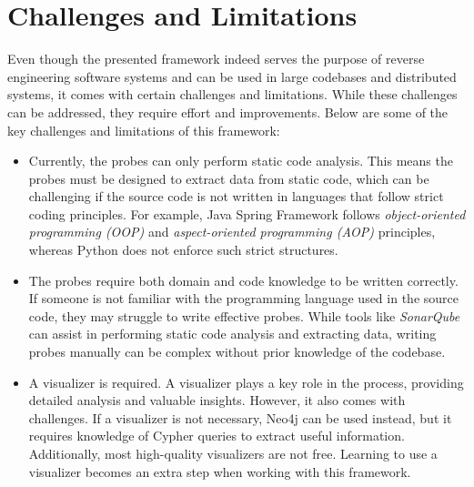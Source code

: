 \section{Challenges and Limitations}

Even though the presented framework indeed serves the purpose of reverse engineering software systems and can be used in large codebases and distributed systems, it comes with certain challenges and limitations. While these challenges can be addressed, they require effort and improvements. Below are some of the key challenges and limitations of this framework:

\begin{itemize}[before={\vspace{10pt}}, after={\vspace{10pt}}]
    \item Currently, the probes can only perform static code analysis. This means the probes must be designed to extract data from static code, which can be challenging if the source code is not written in languages that follow strict coding principles. For example, Java Spring Framework follows \textit{object-oriented programming (OOP)} and \textit{aspect-oriented programming (AOP)} principles, whereas Python does not enforce such strict structures.
    \vspace{10pt}

    \item The probes require both domain and code knowledge to be written correctly. If someone is not familiar with the programming language used in the source code, they may struggle to write effective probes. While tools like \textit{SonarQube} can assist in performing static code analysis and extracting data, writing probes manually can be complex without prior knowledge of the codebase.
    \vspace{10pt}

    \item A visualizer is required. A visualizer plays a key role in the process, providing detailed analysis and valuable insights. However, it also comes with challenges. If a visualizer is not necessary, Neo4j can be used instead, but it requires knowledge of Cypher queries to extract useful information. Additionally, most high-quality visualizers are not free. Learning to use a visualizer becomes an extra step when working with this framework.
\end{itemize}